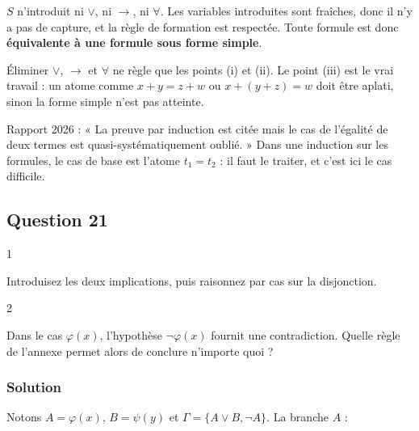 \documentclass[11pt,a4paper]{article}
\newcommand{\equationajustee}[1]{%
  \sbox{\boiteequation}{$\displaystyle #1$}%
  \ifdim\wd\boiteequation>\linewidth
    \[\resizebox{\linewidth}{!}{\usebox{\boiteequation}}\]%
  \else
    \[#1\]%
  \fi}
\begin{document}
\(S\) n'introduit ni \(\vee\), ni \(\to\), ni \(\forall\). Les variables introduites sont fraîches, donc il n'y a pas de capture, et la règle de formation est respectée. Toute formule est donc \textbf{équivalente à une formule sous forme simple}.

\begin{piege}

Éliminer \(\vee\), \(\to\) et \(\forall\) ne règle que les points (i) et (ii). Le point (iii) est le vrai travail : un atome comme \(x+y=z+w\) ou \(x+(y+z)=w\) doit être aplati, sinon la forme simple n'est pas atteinte.

\end{piege}

\begin{jury}

Rapport 2026 : « La preuve par induction est citée mais le cas de l'égalité de deux termes est quasi-systématiquement oublié. » Dans une induction sur les formules, le cas de base est l'atome \(t_1=t_2\) : il faut le traiter, et c'est ici le cas difficile.

\end{jury}

\hypertarget{question-21}{%
\subsection{Question 21}\label{question-21}}

\begin{indication}{1}

Introduisez les deux implications, puis raisonnez par cas sur la disjonction.

\end{indication}

\begin{indication}{2}

Dans le cas \(\varphi(x)\), l'hypothèse \(\neg\varphi(x)\) fournit une contradiction. Quelle règle de l'annexe permet alors de conclure n'importe quoi ?

\end{indication}

\hypertarget{solution-20}{%
\subsubsection{Solution}\label{solution-20}}

Notons \(A=\varphi(x)\), \(B=\psi(y)\) et \(\Gamma=\{A\vee B,\neg A\}\). La branche \(A\) :
\equationajustee{\mathcal{D}=\dfrac{\dfrac{\dfrac{}{\Gamma,A\vdash\neg A}\,\mathrm{ax}\qquad\dfrac{}{\Gamma,A\vdash A}\,\mathrm{ax}}{\Gamma,A\vdash\bot}\,\neg e}{\Gamma,A\vdash B}\,\bot}
\end{document}
